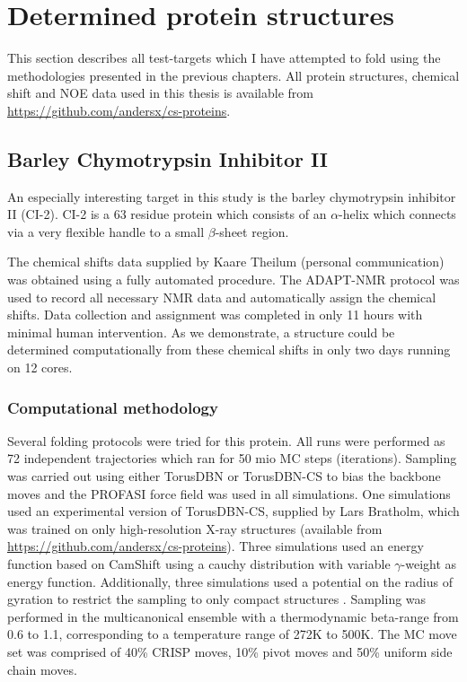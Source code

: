 \chapter{Determined protein structures}
\label{chapter:results}
This section describes all test-targets which I have attempted to fold using the methodologies presented in the previous chapters.
All protein structures, chemical shift and NOE data used in this thesis is available from \url{https://github.com/andersx/cs-proteins}.


\section{Barley Chymotrypsin Inhibitor II}

An especially interesting target in this study is the barley chymotrypsin inhibitor II (CI-2). CI-2 is a 63 residue protein which consists of an $\alpha$-helix which connects via a very flexible handle to a small $\beta$-sheet region.

The chemical shifts data supplied by Kaare Theilum (personal communication) was obtained using a fully automated procedure.
The ADAPT-NMR \cite{adaptnmr} protocol was used to record all necessary NMR data and automatically assign the chemical shifts.
Data collection and assignment was completed in only 11 hours with minimal human intervention.
As we demonstrate, a structure could be determined computationally from these chemical shifts in only two days running on 12 cores.



\subsection{Computational methodology}
Several folding protocols were tried for this protein. All runs were performed as 72 independent trajectories which ran for 50 mio MC steps (iterations).
Sampling was carried out using either TorusDBN or TorusDBN-CS to bias the backbone moves and the PROFASI force field was used in all simulations.
One simulations used an experimental version of TorusDBN-CS, supplied by Lars Bratholm, which was trained on only high-resolution X-ray structures (available from \url{https://github.com/andersx/cs-proteins}).
Three simulations used an energy function based on CamShift using a cauchy distribution with variable $\gamma$-weight as energy function.
Additionally, three simulations used a potential on the radius of gyration to restrict the sampling to only compact structures \cite{Phaistos_oldest}.
Sampling was performed in the multicanonical ensemble with a thermodynamic beta-range from 0.6 to 1.1, corresponding to a temperature range of 272K to 500K. The MC move set was comprised of 40\% CRISP moves, 10\% pivot moves and 50\% uniform side chain moves.


